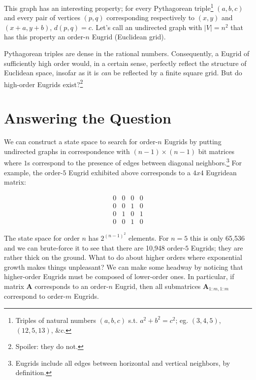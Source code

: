 \documentclass[letterpaper]{article}
\begin{document}
\begin{center}
  
\end{center}

This graph has an interesting property; for every Pythagorean triple\footnote{Triples of
natural numbers $(a, b, c)$ s.t. $a^2 + b^2 = c^2$; eg. $(3, 4, 5)$, $(12, 5, 13)$, \&c.}
$(a, b, c)$ and every pair of vertices $(p, q)$ corresponding respectively to $(x, y)$ and
$(x + a, y + b)$, $d(p, q) = c$. Let's call an undirected graph with $|V| = n^2$ that has
this property an order-$n$ Eugrid (Euclidean grid).

Pythagorean triples are dense in the rational numbers. Consequently, a Eugrid of sufficiently
high order would, in a certain sense, perfectly reflect the structure of Euclidean space, insofar as
it is \emph{can} be reflected by a finite square grid. But do high-order Eugrids
exist?\footnote{Spoiler: they do not.}

\section{Answering the Question}

We can construct a state space to search for order-$n$ Eugrids by putting undirected graphs
in correspondence with $(n - 1) \times (n - 1)$ bit matrices where $1$s correspond to the
presence of edges between diagonal neighbors.\footnote{Eugrids include all edges between
horizontal and vertical neighbors, by definition.} For example, the order-$5$ Eugrid
exhibited above corresponds to a $4 x 4$ Eugridean matrix:

\begin{equation*}
\begin{matrix}
  0 & 0 & 0 & 0 \\
  0 & 0 & 1 & 0 \\
  0 & 1 & 0 & 1 \\
  0 & 0 & 1 & 0
\end{matrix}
\end{equation*}

The state space for order $n$ has $2^{(n-1)^2}$ elements. For $n=5$ this is only 65,536 and
we can brute-force it to see that there are 10,948 order-$5$ Eugrids; they are rather thick
on the ground. What to do about higher orders where exponential growth makes things
unpleasant? We can make some headway by noticing that higher-order Eugrids must be composed
of lower-order ones. In particular, if matrix $\mathbf{A}$ corresponds to an order-$n$
Eugrid, then all submatrices $\mathbf{A}_{1:m,1:m}$ correspond to order-$m$ Eugrids.
\end{document}
